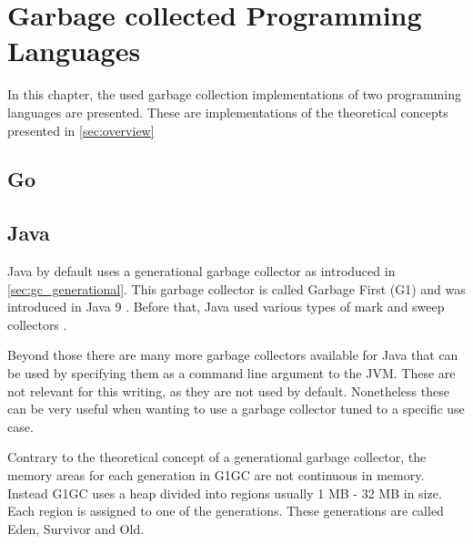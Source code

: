 \chapter{Garbage collected Programming Languages}

In this chapter, the used garbage collection implementations of two programming
languages are presented. These are implementations of the theoretical concepts
presented in \autoref{sec:overview}

\section{Go}
\section{Java}

Java by default uses a generational garbage collector as introduced in \autoref{sec:gc_generational}.
This garbage collector is called Garbage First (G1) and was introduced in Java 9 \cite{java_gc_comparison_2018}.
Before that, Java used various types of mark and sweep collectors \cite{java_available_gcs}.

Beyond those there are many more garbage collectors available for Java that can
be used by specifying them as a command line argument to the JVM.
These are not relevant for this writing, as they are not used by default.
Nonetheless these can be very useful when wanting to use a garbage collector
tuned to a specific use case.

Contrary to the theoretical concept of a generational garbage collector,
the memory areas for each generation in G1GC are not continuous in memory.
Instead G1GC uses a heap divided into regions usually 1 MB - 32 MB in size.
Each region is assigned to one of the generations.
These generations are called Eden, Survivor and Old. \cite{java_g1_getting_started}


